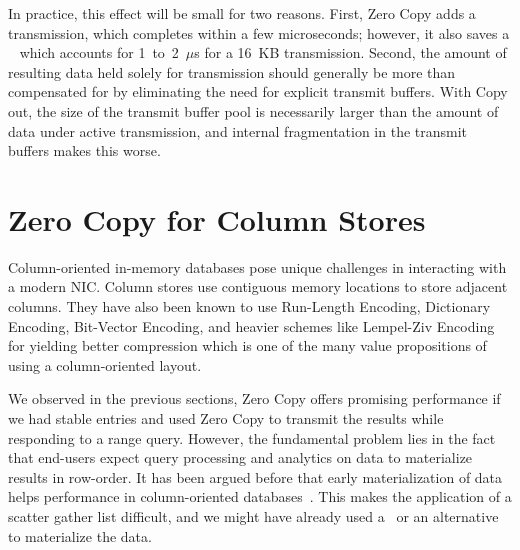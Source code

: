 In practice, this effect will be small for two reasons. First, Zero Copy adds a
transmission, which completes within a few microseconds; however, it also saves a
\memcpy~ which accounts for 1~to~2~$\mu$s for a 16~KB transmission. Second, the
amount of resulting data held solely for transmission should generally be
more than compensated for by eliminating the need for explicit transmit
buffers. With Copy out, the size of the transmit buffer pool is necessarily
larger than the amount of data under active transmission, and internal
fragmentation in the transmit buffers makes this worse.


\section{Zero Copy for Column Stores}

Column-oriented in-memory databases pose unique challenges in interacting with a modern NIC. 
Column stores use contiguous memory locations to store adjacent columns. They have also been known 
to use Run-Length Encoding, Dictionary Encoding, Bit-Vector Encoding, and heavier schemes 
like Lempel-Ziv Encoding for yielding better compression which is one of the many value 
propositions of using a column-oriented layout. 

We observed in the previous  sections, Zero Copy offers promising performance if 
we had stable entries and used Zero Copy to transmit the results while responding to a range query. 
However, the fundamental problem lies in the fact that end-users expect query processing and analytics on data 
to materialize results in row-order. It has been argued before that early materialization of data
helps performance in column-oriented databases~\cite{cstore-material}. This makes the application 
of a scatter gather list difficult, and we might have already used a \memcpy ~or an alternative 
to materialize the data. 

